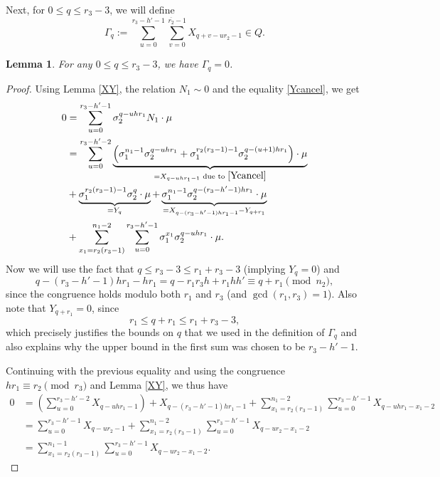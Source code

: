 \documentclass[12pt,a4paper]{article}
\newtheorem{lemma}[theorem]{Lemma}
\theoremstyle{definition}
\newcommand{\uo}{\overline{r_2}}
\begin{document}
Next, for $0\leq q \leq r_3-3$, we will define $$\Gamma_q:=\sum_{u=0}^{r_3-h'-1}\sum_{v=0}^{\uo-1}X_{q+v-ur_2-1}\in Q.$$

\begin{lemma}
For any $0\leq q \leq r_3-3$, we have $\Gamma_q=0$.
\end{lemma}
\begin{proof}
Using Lemma \ref{XY}, the relation $N_1\sim 0$ and the equality \eqref{Ycancel}, 
we get
\begin{align*}
0&= \sum_{u=0}^{r_3-h'-1} \sigma_2^{q-uhr_1}N_1\cdot \mu\\
&= \sum_{u=0}^{r_3-h'-2}  \underbrace{\left(\sigma_1^{n_1-1}\sigma_2^{q-uh r_1} +\sigma_1^{r_2(r_3-1)-1}\sigma_2^{q-(u+1)h r_1}\right)\cdot \mu}_{=X_{q-uhr_1-1} \text{ due to } \eqref{Ycancel}}\\
&+\underbrace{\sigma_1^{r_2(r_3-1)-1}\sigma_2^q\cdot \mu}_{=Y_q}+
\underbrace{\sigma_1^{n_1-1}\sigma_2^{q-(r_3-h'-1)h r_1}\cdot\mu}_{=X_{q-(r_3-h'-1)hr_1-1}-Y_{q+r_1}}\\
&+\sum_{x_1=r_2(r_3-1)}^{n_1-2}\sum_{u=0}^{r_3-h'-1} \sigma_1^{x_1}\sigma_2^{q-uh r_1}\cdot \mu.
\end{align*}
Now we will use the fact that $q\leq r_3-3\leq r_1+r_3-3$ (implying $Y_q=0$) and $$q-(r_3-h'-1)h r_1-hr_1=q-r_1r_3h+r_1hh'\equiv q+r_1\pmod{n_2},$$ since the congruence holds modulo both $r_1$ and $r_3$ (and $\gcd(r_1,r_3)=1$). Also note that $Y_{q+r_1}=0$, since
$$r_1\leq q+r_1\leq r_1+r_3-3,$$
which precisely justifies the bounds on $q$ that we used in the definition of $\Gamma_q$ and also explains why the upper bound in the first sum was chosen to be $r_3-h'-1$.

Continuing with the previous equality and using the congruence $hr_1\equiv r_2\pmod{r_3}$ and Lemma \ref{XY}, we thus have
\begin{align*}
0&= \left(\sum_{u=0}^{r_3-h'-2} X_{q-uhr_1-1}\right)+X_{q-(r_3-h'-1)hr_1-1}+\sum_{x_1=r_2(r_3-1)}^{n_1-2}\sum_{u=0}^{r_3-h'-1} X_{q-uh r_1-x_1-2}\\
&=\sum_{u=0}^{r_3-h'-1} X_{q-ur_2-1}+\sum_{x_1=r_2(r_3-1)}^{n_1-2}\sum_{u=0}^{r_3-h'-1} X_{q-ur_2-x_1-2}\\
&=\sum_{x_1=r_2(r_3-1)}^{n_1-1}\sum_{u=0}^{r_3-h'-1} X_{q-ur_2-x_1-2}.
\end{align*}


\end{proof}
\end{document}
